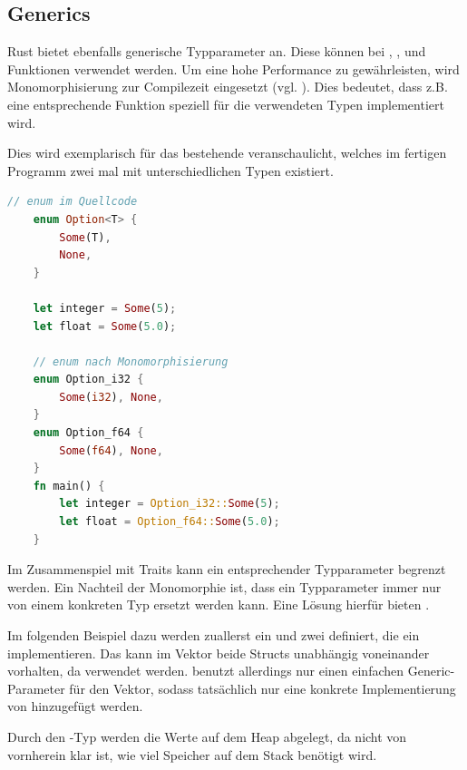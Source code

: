 \documentclass[11pt,a4paper, ngerman]{article}
\begin{document}
\subsection{Generics}
Rust bietet ebenfalls generische Typparameter an. Diese können bei , ,  und Funktionen verwendet werden. Um eine hohe Performance zu gewährleisten, wird Monomorphisierung zur Compilezeit eingesetzt (vgl. \cite[S. 196 ff.]{SK19}). Dies bedeutet, dass z.B. eine entsprechende Funktion speziell für die verwendeten Typen implementiert wird.

Dies wird exemplarisch für das bestehende   veranschaulicht, welches im fertigen Programm zwei mal mit unterschiedlichen Typen existiert.

\begin{lstlisting}[language=rust, caption={Monomorphisierung Veranschaulichung \cite{MonoCodeEx}}]
    // enum im Quellcode
    enum Option<T> {
        Some(T),
        None,
    }

    let integer = Some(5);
    let float = Some(5.0);
    
    // enum nach Monomorphisierung
    enum Option_i32 {
        Some(i32), None,
    }
    enum Option_f64 {
        Some(f64), None,
    }
    fn main() {
        let integer = Option_i32::Some(5);
        let float = Option_f64::Some(5.0);
    }
\end{lstlisting}

Im Zusammenspiel mit Traits kann ein entsprechender Typparameter begrenzt werden. Ein Nachteil der Monomorphie ist, dass ein Typparameter immer nur von einem konkreten Typ ersetzt werden kann. Eine Lösung hierfür bieten .

Im folgenden Beispiel dazu werden zuallerst ein  und zwei  definiert, die ein  implementieren. Das  kann im Vektor  beide Structs unabhängig voneinander vorhalten, da  verwendet werden.  benutzt allerdings nur einen einfachen Generic-Parameter für den Vektor, sodass tatsächlich nur eine konkrete Implementierung von  hinzugefügt werden.

Durch den -Typ werden die Werte auf dem Heap abgelegt, da nicht von vornherein klar ist, wie viel Speicher auf dem Stack benötigt wird.
\end{document}
